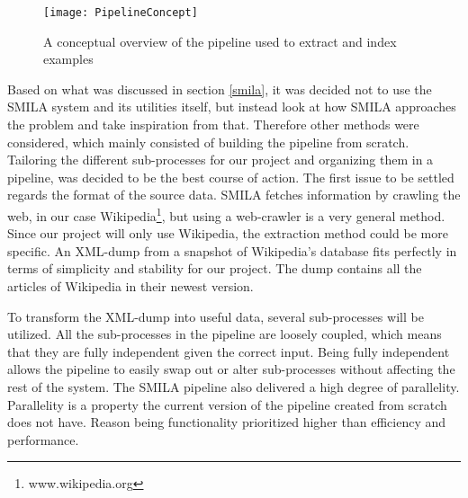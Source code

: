 \begin{figure}[h]
\caption{A conceptual overview of the pipeline used to extract and index examples}
\texttt{[image: PipelineConcept]}
\end{figure}



Based on what was discussed in section \ref{smila}, it was decided not to use the SMILA system and its utilities itself, but instead look at how SMILA approaches the problem and take inspiration from that. Therefore other methods were considered, which mainly consisted of building the pipeline from scratch. Tailoring the different sub-processes for our project and organizing them in a pipeline, was decided to be the best course of action. The first issue to be settled regards the format of the source data. SMILA fetches information by crawling the web, in our case Wikipedia\footnote{www.wikipedia.org}, but using a web-crawler is a very general method. Since our project will only use Wikipedia, the extraction method could be more specific. An XML-dump from a snapshot of Wikipedia's database fits perfectly in terms of simplicity and stability for our project. The dump contains all the articles of Wikipedia in their newest version.

To transform the XML-dump into useful data, several sub-processes will be utilized. All the sub-processes in the pipeline are loosely coupled, which means that they are fully independent given the correct input. Being fully independent allows the pipeline to easily swap out or alter sub-processes without affecting the rest of the system. The SMILA pipeline also delivered a high degree of parallelity. Parallelity is a property the current version of the pipeline created from scratch does not have. Reason being functionality prioritized higher than efficiency and performance. 

